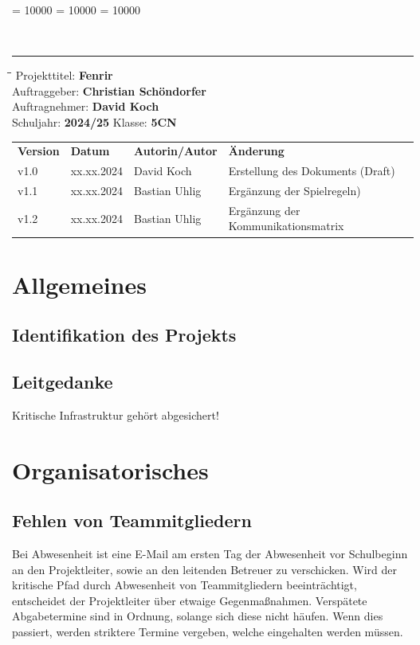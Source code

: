 \documentclass[
	headings=optiontotocandhead,%
	oneside,
	numbers=noenddot,%
	toc=flat, %
	10pt, %
	parskip=full, %
	listof=totoc, %
	listof=flat, %
	numbers=noenddot, %
	bibliography=totoc, %
	a4paper,DIV=14,
]{scrartcl}
\newcommand\Tstrut{\rule{0pt}{3.2ex}}         %
\newcommand\Bstrut{\rule[-1.5ex]{0pt}{0pt}}   %
\newenvironment{nstabbing}
	{\setlength{\topsep}{-\parskip}
		\setlength{\partopsep}{-\parskip}
		\tabbing}
	{\endtabbing}
\begin{document}
\clubpenalty = 10000 %
\widowpenalty = 10000 %
\displaywidowpenalty = 10000

{\sffamily{\textbf{\LARGE{\textcolor{orange}{Spielregeln}}}}}\\
\noindent\rule{\textwidth}{0.1pt}
\begin{nstabbing}
	\hspace{4cm}\=\hspace{4cm}\=\hspace{4cm}\=\kill
	Projekttitel: \> \textbf{Fenrir}\\
	Auftraggeber: \> \textbf{Christian Schöndorfer}\\
	Auftragnehmer: \> \textbf{David Koch}\\
	Schuljahr: \> \textbf{2024/25}
	\> Klasse: \> \textbf{5CN}\\
\end{nstabbing}
{\smaller
	\begin{tabularx}{\textwidth}{l l l l}
	\hline
	\textbf{Version} & \textbf{Datum} & \textbf{Autorin/Autor} & \textbf{Änderung}\Tstrut  \\
	v1.0 & xx.xx.2024 & David Koch & Erstellung des Dokuments (Draft)\Tstrut  \\
	v1.1 & xx.xx.2024 & Bastian Uhlig & Ergänzung der Spielregeln)\Tstrut  \\
	v1.2 & xx.xx.2024 & Bastian Uhlig & Ergänzung der Kommunikationsmatrix \Bstrut \\
	\hline
	\end{tabularx}
}

\section{Allgemeines}
\subsection{Identifikation des Projekts}
\blindtext
\subsection{Leitgedanke}
Kritische Infrastruktur gehört abgesichert!


\section{Organisatorisches}
\subsection{Fehlen von Teammitgliedern}
Bei Abwesenheit ist eine E-Mail am ersten Tag der Abwesenheit vor Schulbeginn an den Projektleiter, sowie an den leitenden Betreuer zu verschicken. Wird der kritische Pfad durch Abwesenheit von Teammitgliedern beeinträchtigt, entscheidet der Projektleiter über etwaige Gegenmaßnahmen. Verspätete Abgabetermine sind in Ordnung, solange sich diese nicht häufen. Wenn dies passiert, werden striktere Termine vergeben, welche eingehalten werden müssen.
\end{document}
